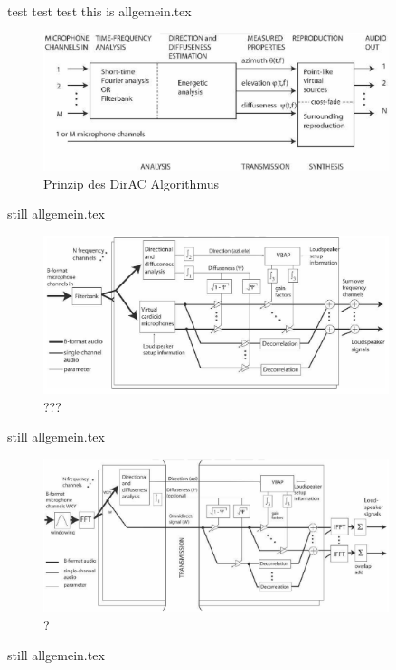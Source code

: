 test test test this is allgemein.tex

\begin{figure}[!ht]
  \centering
  \includegraphics[width=0.9\textwidth]{funktionsweise/pic/pulkki_dirac_flow.png}
  \caption{Prinzip des DirAC Algorithmus}
  \label{fig:dirac_flow_general}
\end{figure}

still allgemein.tex

\begin{figure}[!ht]
  \centering
  \includegraphics[width=0.9\textwidth]{funktionsweise/pic/pulkki_dirac_flow_2.png}
  \caption{???}
  \label{fig:dirac_flow_?}
\end{figure}

still allgemein.tex

\begin{figure}[!ht]
  \centering
  \includegraphics[width=0.9\textwidth]{funktionsweise/pic/pulkki_dirac_flow_3.png}
  \caption{?}
  \label{fig:dirac_flow_???}
\end{figure}

still allgemein.tex
